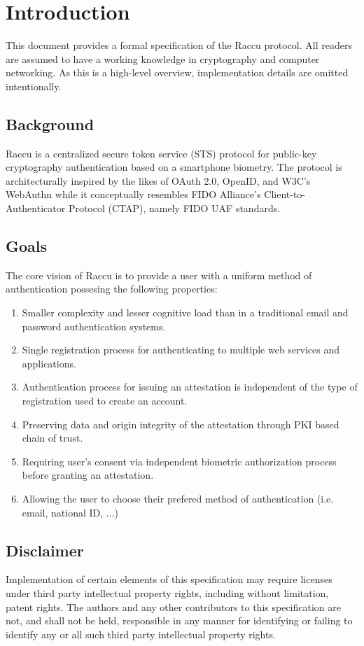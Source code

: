 \section{Introduction}
This document provides a formal specification of the Raccu protocol. All readers are assumed to have a working 
knowledge in cryptography and computer networking. As this is a high-level overview, implementation details are 
omitted intentionally.

    \subsection{Background}
    Raccu is a centralized secure token service (STS) protocol for public-key cryptography authentication 
    based on a smartphone biometry. The protocol is architecturally inspired by the likes of OAuth 2.0, OpenID, 
    and W3C's WebAuthn while it conceptually resembles FIDO Alliance's Client-to-Authenticator Protocol (CTAP), 
    namely FIDO UAF standards.

    \subsection{Goals}
    The core vision of Raccu is to provide a user with a uniform method of authentication possesing the following 
    properties: 
        \begin{enumerate}
            \item Smaller complexity and lesser cognitive load than in a traditional email and password 
                  authentication systems.
            \item Single registration process for authenticating to multiple web services and applications.
            \item Authentication process for issuing an attestation is independent of the type of registration 
                  used to create an account.
            \item Preserving data and origin integrity of the attestation through PKI based chain of trust.
            \item Requiring user's consent via independent biometric authorization process before granting an 
                  attestation.
            \item Allowing the user to choose their prefered method of authentication (i.e. email, national ID, ...)
        \end{enumerate}

    \subsection{Disclaimer}
    Implementation of certain elements of this specification may require licenses under third party intellectual 
    property rights, including without limitation, patent rights. The authors and any other contributors to this 
    specification are not, and shall not be held, responsible in any manner for identifying or failing to identify 
    any or all such third party intellectual property rights.    
    

